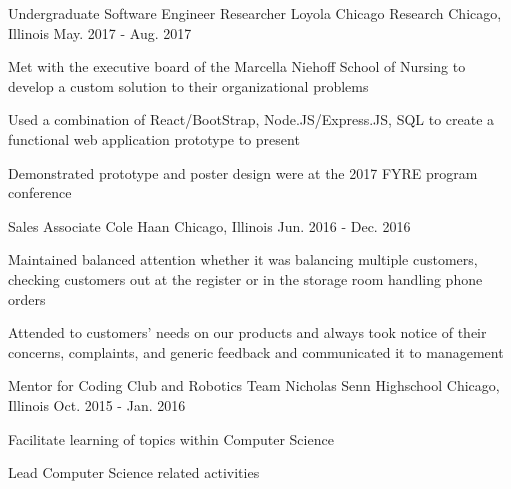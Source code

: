 \begin{cventries}
  \cventry
    {Undergraduate Software Engineer Researcher}
    {Loyola Chicago Research }
    {Chicago, Illinois}
    {May. 2017 -  Aug. 2017}
    {
      \begin{cvitems}
        \item {Met with the executive board of the Marcella Niehoff School of Nursing to develop a custom solution to their organizational problems}
        \item {Used a combination of React/BootStrap, Node.JS/Express.JS, SQL to create a functional web application prototype to present}
        \item {Demonstrated prototype and poster design were at the 2017 FYRE program conference}
      \end{cvitems}
    }
  \cventry
    {Sales Associate}
    {Cole Haan}
    {Chicago, Illinois}
    {Jun. 2016 - Dec. 2016}
    {
      \begin{cvitems}
        \item {Maintained balanced attention whether it was balancing multiple customers, checking customers out at the register or in the storage room handling phone orders}
        \item {Attended to customers’ needs on our products and always took notice of their concerns, complaints, and generic feedback and communicated it to management}
      \end{cvitems}
    }
  \cventry
    {Mentor for Coding Club and Robotics Team}
    {Nicholas Senn Highschool}
    {Chicago, Illinois}
    {Oct. 2015 - Jan. 2016}
    {
      \begin{cvitems}
        \item {Facilitate learning of topics within Computer Science}
        \item {Lead Computer Science related activities}
      \end{cvitems} 
    }
  
\end{cventries}
